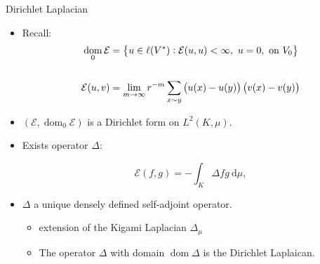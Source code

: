 \documentclass{beamer}
\DeclareMathOperator{\dom}{dom}
\newcommand{\dd}{\ \text{d}}
\begin{document}
	\begin{frame}{Dirichlet Laplacian}
		
		\vspace{3em}
		\begin{itemize}
			\item<1-> Recall: 
			\vspace{-1em}
			\begin{align}
				\dom_0 \mathcal{E} &= \cbr{u \in \ell(V^{*}) : \mathcal{E}(u,u) < \infty, \ u = 0,\text{ on } V_0 } \\ 
				&\phantom{a} \\
				\mathcal{E}(u, v) &= \lim_{m \to \infty} r^{-m}\sum_{x \sim y} \left(u(x) - u(y) \right)\left(v(x) - v(y) \right)
			\end{align}
			\vspace{-1em}
			\item<2-> $(\mathcal{E}, \dom_{0}\mathcal{E})$ is a Dirichlet form on $L^{2}(K, \mu)$.
			
			\item<3-> Exists operator $\Delta$:  
			
			\vspace{-1.5em}
			\begin{equation}
				\mathcal{E}(f,g) = - \int_{K}\Delta f g \dd \mu,
			\end{equation}
			
			\vspace{-0.5em}
			\item<4-> $\Delta$ a unique densely defined self-adjoint operator. 
			\begin{itemize}
				\item<5-> extension of the Kigami Laplacian $\Delta_{\mu}$
				\item<6->  The operator $\Delta$ with domain $\dom \Delta$ is the Dirichlet Laplaican. 
			\end{itemize}
		\end{itemize}
	\end{frame}
	
\end{document}
